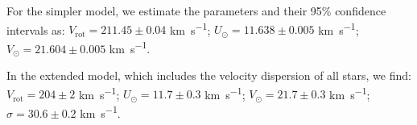 For the simpler model, we estimate the parameters and their 95\% confidence intervals as:  
$V_{\text{rot}} = 211.45 \pm 0.04$ \unit{\kilo\meter\per\second};  
$U_{\odot} = 11.638 \pm 0.005$ \unit{\kilo\meter\per\second};  
$V_{\odot} = 21.604 \pm 0.005$ \unit{\kilo\meter\per\second}.  

In the extended model, which includes the velocity dispersion of all stars, we find: 
$V_{\text{rot}} = 204 \pm 2$ \unit{\kilo\meter\per\second};  
$U_{\odot} = 11.7 \pm 0.3$ \unit{\kilo\meter\per\second};  
$V_{\odot} = 21.7 \pm 0.3$ \unit{\kilo\meter\per\second};  
$\sigma = 30.6 \pm 0.2$ \unit{\kilo\meter\per\second}.  

